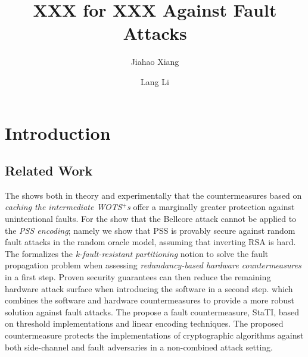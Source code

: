 \documentclass[journal=tches,final]{iacrtrans}
\author{Jiahao Xiang\inst{1} \and Lang Li\inst{1}}
\institute{
  Hengyang Normal University, College of Computer Science and Technology, Hengyang, China
}
\title{ XXX for XXX Against Fault Attacks}
\begin{document}
\maketitle




\begin{abstract}

\end{abstract}


\section{Introduction}

\subsection{Related Work}

The \cite{TCHES:Genet23} shows both in theory and experimentally that the countermeasures based on \textit{caching the intermediate
WOTS$^{+}$s} offer a marginally greater protection against unintentional faults. 
For the \cite{AC:CorMan09} show that the Bellcore attack cannot be applied to the \textit{PSS encoding}; namely we show that PSS is provably secure against random fault attacks in the random oracle model, assuming that inverting RSA is hard. 
The \cite{TCHES:THNABC24}  formalizes the \textit{k-fault-resistant partitioning} notion to solve the fault propagation problem when assessing \textit{redundancy-based hardware countermeasures} in a first step. Proven security guarantees can then reduce the remaining hardware attack surface when introducing the software in a second step. which combines the software and hardware countermeasures to provide a more robust solution against fault attacks. 
The \cite{TCHES:DhoOvcTop24} propose a fault countermeasure, StaTI, based on threshold implementations and linear encoding techniques. The proposed countermeasure protects the implementations of cryptographic algorithms against both side-channel and fault adversaries in a non-combined attack setting.



\end{document}
